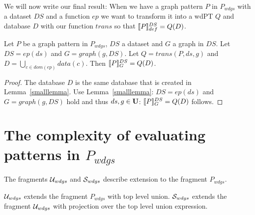 We will now write our final result: When we have a graph pattern $P$ in
$P_{wdgs}$ with a dataset $DS$ and a function $ep$ we want to transform it into a
wdPT $Q$ and database $D$ with our function $trans$ so that
$\llbracket P \rrbracket^{DS}_{def} = Q(D)$.
\begin{theorem}\label{biglemma}
    Let $P$ be a graph pattern in $P_{wdgs}$, $DS$ a dataset and $G$ a graph in $DS$.
    Let $DS = ep(ds)$  and $G = graph(g,DS)$. Let $Q = trans(P,ds,g)$ 
    and $D = \bigcup\limits_{c \in dom(ep)} data(c)$. Then $\llbracket P \rrbracket^{DS}_G = Q(D)$.
\end{theorem}
\begin{proof}
	The database $D$ is the same database that is created in
	Lemma~\ref{smalllemma}.
	Use Lemma~\ref{smalllemma}: 
	$DS = ep(ds)$  and $G = graph(g,DS)$ hold and thus $ds,g \in \mathbf{U}$:
	$\llbracket P \rrbracket^{DS}_G = Q(D)$ follows.
\end{proof}


\section{The complexity of evaluating patterns in $P_{wdgs}$}
The fragments $\mathcal{U}_{wdgs}$ and $\mathcal{S}_{wdgs}$ describe extension to the fragment
$P_{wdgs}$.
\begin{definition}
	$\mathcal{U}_{wdgs}$ extends the fragment $P_{wdgs}$ with top level union.
	$\mathcal{S}_{wdgs}$ extends the fragment $\mathcal{U}_{wdgs}$ with projection over the top
	level union expression.
\end{definition}

